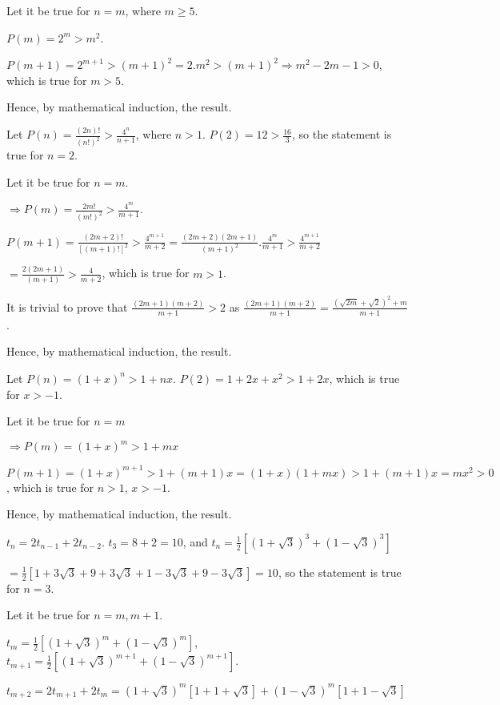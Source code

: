   Let it be true for $n = m$, where $m\geq 5$.

  $P(m) = 2^m > m^2$.

  $P(m + 1) = 2^{m + 1} > (m + 1)^2 = 2.m^2 > (m + 1)^2 \Rightarrow m^2 -2m - 1 > 0$, which is true for $m >
  5$.

  Hence, by mathematical induction, the result.
\item Let $P(n) = \frac{(2n)!}{(n!)^2} > \frac{4^n}{n + 1}$, where $n > 1$. $P(2) = 12 > \frac{16}{3}$, so
  the statement is true for $n = 2$.

  Let it be true for $n = m$.

  $\Rightarrow P(m) = \frac{2m!}{(m!)^2} > \frac{4^m}{m + 1}$.

  $P(m + 1) = \frac{(2m + 2)!}{[(m+ 1)!]^2} > \frac{4^{m + 1}}{m + 2} = \frac{(2m + 2)(2m + 1)}{(m +
    1)^2}.\frac{4^m}{m + 1} > \frac{4^{m + 1}}{m + 2}$

  $= \frac{2(2m + 1)}{(m + 1)} > \frac{4}{m + 2}$, which is true for $m > 1$.

  It is trivial to prove that $\frac{(2m + 1)(m + 2)}{m + 1} > 2$ as $\frac{(2m + 1)(m + 2)}{m + 1} =
  \frac{(\sqrt{2m} + \sqrt{2})^2 + m}{m + 1}$.

  Hence, by mathematical induction, the result.
\item Let $P(n) = (1 + x)^n > 1 + nx$. $P(2) = 1 + 2x + x^2 > 1 + 2x$, which is true for $x > -1$.

  Let it be true for $n = m$

  $\Rightarrow P(m) = (1 + x)^m > 1 + mx$

  $P(m + 1) = (1 + x)^{m + 1}> 1 + (m + 1)x = (1 + x)(1 + mx) > 1 + (m + 1)x = mx^2 > 0$, which is true for
  $n > 1$, $x > -1$.

  Hence, by mathematical induction, the result.
\item $t_n = 2t_{n - 1 } + 2t_{n - 2}$. $t_3 = 8 + 2 = 10$, and $t_n = \frac{1}{2}\left[(1 + \sqrt{3})^3 +
  (1 - \sqrt{3})^3\right]$

  $= \frac{1}{2}\left[1 + 3\sqrt{3} + 9 + 3\sqrt{3} + 1 - 3\sqrt{3} + 9 - 3\sqrt{3}\right] = 10$, so the
  statement is true for $n = 3$.

  Let it be true for $n = m, m + 1$.

  $t_m = \frac{1}{2}[(1 + \sqrt{3})^m + (1 - \sqrt{3})^m]$, $t_{m + 1} = \frac{1}{2}[(1 + \sqrt{3})^{m + 1}
    + (1 - \sqrt{3})^{m + 1}]$.

  $t_{m + 2} = 2t_{m + 1} + 2t_{m} = (1 + \sqrt{3})^m[1 + 1 + \sqrt{3}] + (1 - \sqrt{3})^m[1 + 1 -
    \sqrt{3}]$

